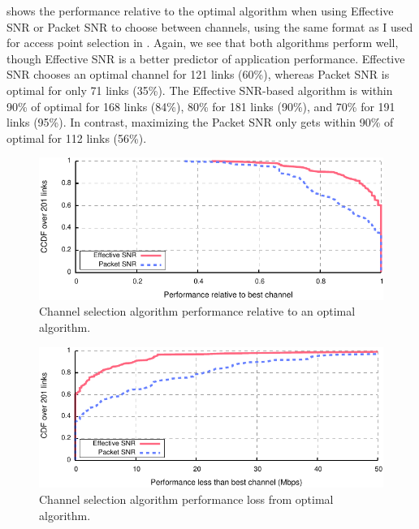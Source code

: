  shows the performance relative to the optimal algorithm when using Effective SNR or Packet SNR to choose between channels, using the same format as I used for access point selection in . Again, we see that both algorithms perform well, though Effective SNR is a better predictor of application performance. Effective SNR chooses an optimal channel for 121 links (60\%), whereas Packet SNR is optimal for only 71 links (35\%). The Effective SNR-based algorithm is within 90\% of optimal for 168 links (84\%), 80\% for 181 links (90\%), and 70\% for 191 links (95\%). In contrast, maximizing the Packet SNR only gets within 90\% of optimal for 112 links (56\%).

\begin{figure}[p]
	\centering
	\includegraphics[width=\textwidth]{figures/applications/chan_sel_ratio_opt.pdf}
	\caption[Channel selection algorithm performance relative to Optimal]{\label{fig:chan_sel_ratio_opt}Channel selection algorithm performance relative to an optimal algorithm.}
\end{figure}
\begin{figure}[p]
	\centering
	\includegraphics[width=\textwidth]{figures/applications/chan_sel_diff_opt.pdf}
	\caption[Channel selection algorithm performance loss from Optimal]{\label{fig:chan_sel_delta_opt}Channel selection algorithm performance loss from optimal algorithm.}
\end{figure}
